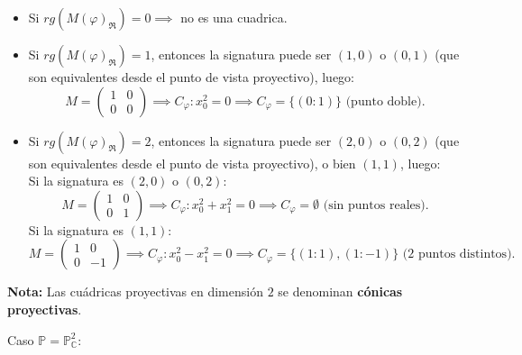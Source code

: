 \begin{itemize}
    \item Si $rg(M(\varphi)_{\mathfrak{R}}) = 0 \implies$ no es una cuadrica.
    \item Si $rg(M(\varphi)_{\mathfrak{R}}) = 1$, entonces la signatura puede ser $(1,0)$ o $(0,1)$ (que son equivalentes desde el punto de vista proyectivo), luego:
    \[
        M = \begin{pmatrix}
            1 & 0 \\
            0 & 0
        \end{pmatrix} \implies C_\varphi : x_0^2 = 0 \implies C_\varphi = \{ (0 : 1) \} \text{ (punto doble).}
    \]
    \item Si $rg(M(\varphi)_{\mathfrak{R}}) = 2$, entonces la signatura puede ser $(2,0)$ o $(0,2)$ (que son equivalentes desde el punto de vista proyectivo), o bien $(1,1)$, luego:\\
    Si la signatura es $(2,0)$ o $(0,2)$:
    \[
        M = \begin{pmatrix}
            1 & 0 \\
            0 & 1
        \end{pmatrix} \implies C_\varphi : x_0^2 + x_1^2 = 0 \implies C_\varphi = \emptyset \text{ (sin puntos reales).}
    \]
    Si la signatura es $(1,1)$:
    \[
        M = \begin{pmatrix}
            1 & 0 \\
            0 & -1
        \end{pmatrix} \implies C_\varphi : x_0^2 - x_1^2 = 0 \implies C_\varphi = \{ (1 : 1), (1 : -1) \} \text{ (2 puntos distintos).}
    \]
\end{itemize}

\textbf{Nota:} Las cuádricas proyectivas en dimensión $2$ se denominan \textbf{cónicas proyectivas}.

Caso $\mathbb{P} = \mathbb{P}^2_\mathbb{C}$:

